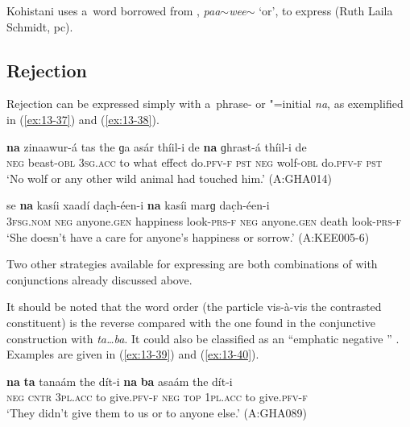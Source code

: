Kohistani \iliShina uses a~word borrowed from \iliPunjabi, \textit{paa$\sim$wee$\sim$} `or', to express  (Ruth Laila Schmidt, pc).


\subsection{Rejection}
\label{subsec:13-2-4}

 Rejection can be expressed simply with a~phrase- or "=initial  \textit{na}, as exemplified in (\ref{ex:13-37}) and (\ref{ex:13-38}).

\ea
\label{ex:13-37}
\gll \textbf{na} zinaawur-á tas the ɡa asár thíil-i de \textbf{na} ɡhrast-á thíil-i de \\
\textsc{neg} beast-\textsc{obl} \textsc{3sg.acc} to what effect do.\textsc{pfv-f} \textsc{pst}  \textsc{neg} wolf-\textsc{obl} do.\textsc{pfv-f} \textsc{pst} \\
\glt `No wolf or any other wild animal had touched him.' (A:GHA014)

\ex
\label{ex:13-38}
\gll se {\ob}\textbf{na} kasíi xaadí dac̣h-éen-i \textbf{na} kasíi marɡ dac̣h-éen-i{\cb}\\
\textsc{3fsg.nom} \textsc{neg} anyone.\textsc{gen} happiness look-\textsc{prs-f}  \textsc{neg} anyone.\textsc{gen} death look-\textsc{prs-f}  \\
\glt `She doesn't have a care for anyone's happiness or sorrow.' (A:KEE005-6) 
\z

Two other strategies available for expressing  are both combinations of  with conjunctions already discussed above.


 It should be noted that the word order (the particle vis-à-vis the contrasted constituent) is the reverse compared with the one found in the conjunctive construction with \textit{ta{\ldots}ba}. It could also be classified as an ``emphatic negative '' \citep[17--19]{haspelmath2007}. Examples are given in (\ref{ex:13-39}) and (\ref{ex:13-40}).

\ea
\label{ex:13-39}
\gll \textbf{na} \textbf{ta} tanaám the dít-i \textbf{na} \textbf{ba} asaám the dít-i \\
\textsc{neg} \textsc{cntr} \textsc{3pl.acc} to give.\textsc{pfv-f} \textsc{neg} \textsc{top} \textsc{1pl.acc} to give.\textsc{pfv-f}  \\
\glt `They didn't give them to us or to anyone else.' (A:GHA089)

